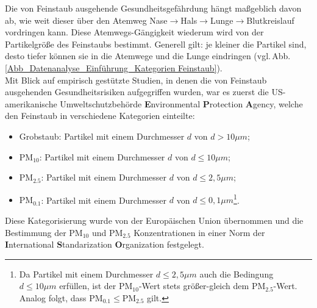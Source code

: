 Die von Feinstaub ausgehende Gesundheitsgefährdung hängt maßgeblich davon 
ab, wie weit dieser über den Atemweg 
Nase$\rightarrow$Hals$\rightarrow$Lunge$\rightarrow$Blutkreislauf 
vordringen kann. Diese Atemwegs-Gängigkeit wiederum wird von der Partikelgröße 
des Feinstaubs bestimmt.
Generell gilt: je kleiner die Partikel sind, desto 
tiefer können sie in die Atemwege und die Lunge eindringen 
(vgl.\,Abb.\,\ref{Abb_Datenanalyse_Einführung_Kategorien Feinstaub}).\\

Mit Blick auf empirisch gestützte Studien, in denen die von Feinstaub 
ausgehenden Gesundheitsrisiken aufgegriffen wurden, war es zuerst die
US-amerikanische Umweltschutzbehörde \textbf{E}nvironmental \textbf{P}rotection
\textbf{A}gency, welche den Feinstaub in verschiedene Kategorien einteilte:
\begin{itemize}[topsep=2pt,parsep=1pt,itemsep=0.5pt]
\item[$\circ$] Grobstaub: Partikel mit einem Durchmesser $d$
von $d > 10\mu m$;
\item[$\circ$] $\mathrm{PM}_{10}$: Partikel mit einem
 Durchmesser $d$ von $d \leq 10\mu m$;
\item[$\circ$] $\mathrm{PM}_{2.5}$: Partikel mit einem
 Durchmesser $d$ von $d \leq 2,5\mu m$;
\item[$\circ$] $\mathrm{PM}_{0.1}$: Partikel mit einem
 Durchmesser $d$ von $d \leq 0,1\mu m$\footnote{Da Partikel mit einem Durchmesser 
$d \leq 2,5\mu m$ auch die Bedingung 
$d \leq 10\mu m$ erfüllen, ist der $\mathrm{PM}_{10}$-Wert 
stets größer-gleich dem $\mathrm{PM}_{2.5}$-Wert. Analog folgt, dass 
$\mathrm{PM}_{0.1} \leq \mathrm{PM}_{2.5}$ gilt.}.
\end{itemize}
\vspace*{3mm}

Diese Kategorisierung wurde von der Europäischen Union übernommen 
und die Bestimmung der $\mathrm{PM}_{10}$ und $\mathrm{PM}_{2.5}$ 
Konzentrationen in einer Norm der
\textbf{I}nternational \textbf{S}tandarization 
\textbf{O}rganization festgelegt.\\

